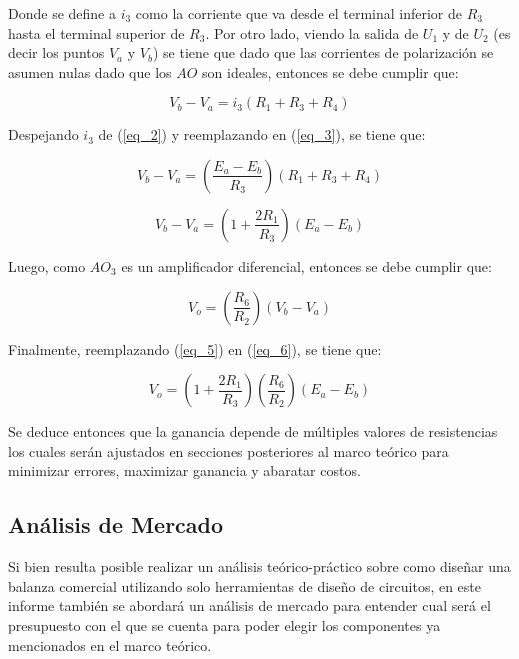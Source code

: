 \documentclass[12pt,a4paper]{article}
\begin{document}
Donde se define a $i_{3}$ como la corriente que va desde el terminal inferior de $R_{3}$ hasta el terminal superior de $R_{3}$. Por otro lado, viendo la salida de $U_1$ y de $U_2$ (es decir los puntos $V_{a}$ y $V_{b}$) se tiene que dado que las corrientes de polarización se asumen nulas dado que los $AO$ son ideales, entonces se debe cumplir que: 

\begin{equation}
    \label{eq_3}
    V_{b}-V_{a}=i_{3}(R_{1}+R_{3}+R_{4})
\end{equation}

Despejando $i_{3}$ de (\ref{eq_2}) y reemplazando en (\ref{eq_3}), se tiene que:

\begin{equation}
    \label{eq_4}
    V_{b}-V_{a} = \left(\frac{E_{a}-E_{b}}{R_3}\right)(R_{1}+R_{3}+R_{4})
\end{equation}

\begin{equation}
    \label{eq_5}
    V_{b}-V_{a} = \left(1 + \frac{2R_{1}}{R_3}\right)(E_{a}-E_{b})
\end{equation}

Luego, como $AO_3$ es un amplificador diferencial, entonces se debe cumplir que:

\begin{equation}
    \label{eq_6}
    V_{o} = \left(\frac{R_{6}}{R_2}\right)(V_{b}-V_{a})
\end{equation}

Finalmente, reemplazando (\ref{eq_5}) en (\ref{eq_6}), se tiene que:

\begin{equation}
    \label{eq_7}
    V_{o} = \left(1 + \frac{2R_{1}}{R_3}\right)\left(\frac{R_{6}}{R_2}\right)(E_{a}-E_{b})
\end{equation}

Se deduce entonces que la ganancia depende de múltiples valores de resistencias los cuales serán ajustados en secciones posteriores al marco teórico para minimizar errores, maximizar ganancia y abaratar costos.



\subsection{Análisis de Mercado}
Si bien resulta posible realizar un análisis teórico-práctico sobre como diseñar una balanza comercial utilizando solo herramientas de diseño de circuitos, en este informe también se abordará un análisis de mercado para entender cual será el presupuesto con el que se cuenta para poder elegir los componentes ya mencionados en el marco teórico.
\end{document}
